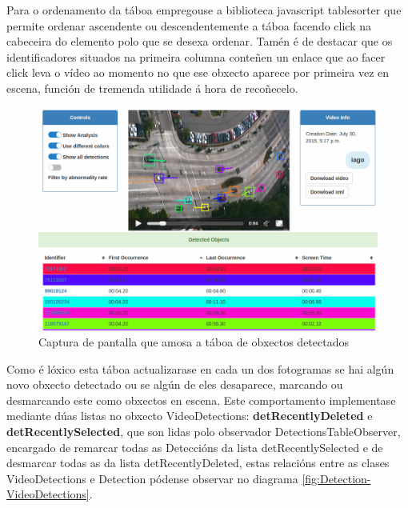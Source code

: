         Para o ordenamento da táboa empregouse a biblioteca javascript tablesorter que permite ordenar
        ascendente ou descendentemente a táboa facendo click na cabeceira do elemento polo que se desexa
        ordenar. Tamén é de destacar que os identificadores situados na primeira columna conteñen un 
        enlace que ao facer click leva o vídeo ao momento no que ese obxecto aparece por primeira vez en
        escena, función de tremenda utilidade á hora de recoñecelo.
        
        \begin{figure}[htp]
        \begin{center}
            \includegraphics[scale=0.4]{figures/DetectionsTable.png}
            \caption{Captura de pantalla que amosa a táboa de obxectos detectados}
        \label{fig:DetectionsTable}
        \end{center}
        \end{figure}
        
        Como é lóxico esta táboa actualizarase en cada un dos fotogramas se hai algún novo obxecto 
        detectado ou se algún de eles desaparece, marcando ou desmarcando este como obxectos en escena.
        Este comportamento implementase mediante dúas listas no obxecto VideoDetections: 
        \textbf{detRecentlyDeleted} e \textbf{detRecentlySelected}, que son lidas polo observador 
        DetectionsTableObserver, encargado de remarcar todas as Deteccións da lista detRecentlySelected
        e de desmarcar todas as da lista detRecentlyDeleted, estas relacións entre as clases 
        VideoDetections e Detection pódense observar no diagrama \ref{fig:Detection-VideoDetections}.
        
